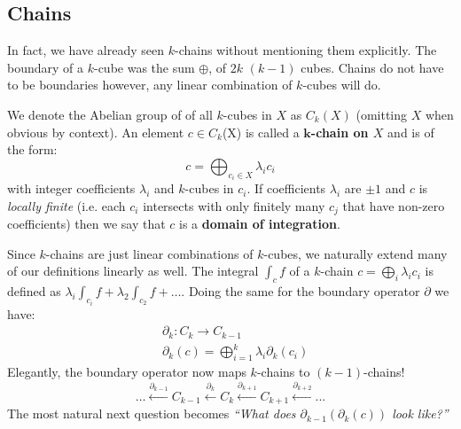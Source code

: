 %
%
\subsection{Chains}

In fact, we have already seen $k$-chains without mentioning them explicitly.
The boundary of a $k$-cube was the sum $\oplus$, of $2k$ $(k-1)$ cubes.
Chains do not have to be boundaries however, any linear combination of $k$-cubes will do.


\begin{definition}
We denote the Abelian group of of all $k$-cubes in $X$ as $C_k(X)$ (omitting $X$ when obvious by context).
An element $c \in C_k$(X) is called a \textbf{$\boldsymbol{k}$-chain on $X$} and is of the form:
\begin{equation}
	c = \bigoplus_{c_i \in X} \lambda_i c_i
\end{equation}
with integer coefficients $\lambda_i$ and  $k$-cubes in $c_i$.
If coefficients $\lambda_i$ are $\pm 1$ and $c$ is \emph{locally finite} (i.e. each $c_i$ intersects with only finitely many $c_j$ that have non-zero coefficients) then we say that $c$ is a \textbf{domain of integration}.
\end{definition}
	
	
Since $k$-chains are just linear combinations of $k$-cubes, we naturally extend many of our definitions linearly as well.
The integral $\int_c f$ of a $k$-chain $c=\bigoplus_i \lambda_i c_i$ is defined as $\lambda_i \int_{c_i} f  + \lambda_2 \int_{c_2} f + \ldots$.
Doing the same for the boundary operator $\partial$ we have:
\begin{align*}
	&\partial_k: C_k \to C_{k-1} \\
	&\partial_k(c) = \bigoplus_{i=1}^k \lambda_i \partial_k(c_i)
\end{align*}
Elegantly, the boundary operator now maps $k$-chains to $(k-1)$-chains!
\begin{equation}
	\ldots \xleftarrow{\partial_{k-1}} C_{k-1} \xleftarrow{\partial_{k}} C_k \xleftarrow{\partial_{k+1}} C_{k+1} \xleftarrow{\partial_{k+2}} ...
\end{equation}
The most natural next question becomes \emph{``What does $\partial_{k-1}( \partial_k ( c ))$ look like?''}




